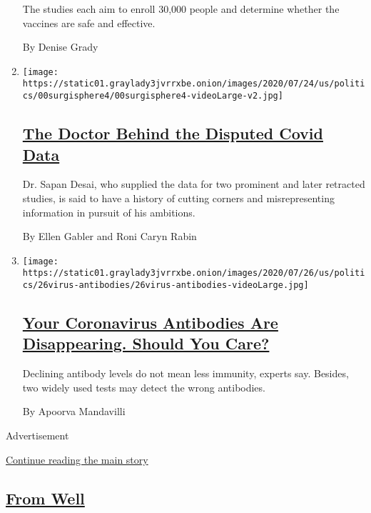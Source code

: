 \begin{enumerate}
  The studies each aim to enroll 30,000 people and determine whether the
  vaccines are safe and effective.

  By Denise Grady
\item
  \texttt{[image: https://static01.graylady3jvrrxbe.onion/images/2020/07/24/us/politics/00surgisphere4/00surgisphere4-videoLarge-v2.jpg]}

  \hypertarget{the-doctor-behind-the-disputed-covid-data}{%
  \subsection{\texorpdfstring{\href{/2020/07/27/science/coronavirus-retracted-studies-data.html}{The
  Doctor Behind the Disputed Covid
  Data}}{The Doctor Behind the Disputed Covid Data}}\label{the-doctor-behind-the-disputed-covid-data}}

  Dr. Sapan Desai, who supplied the data for two prominent and later
  retracted studies, is said to have a history of cutting corners and
  misrepresenting information in pursuit of his ambitions.

  By Ellen Gabler and Roni Caryn Rabin
\item
  \texttt{[image: https://static01.graylady3jvrrxbe.onion/images/2020/07/26/us/politics/26virus-antibodies/26virus-antibodies-videoLarge.jpg]}

  \hypertarget{your-coronavirus-antibodies-are-disappearing-should-you-care}{%
  \subsection{\texorpdfstring{\href{/2020/07/26/health/coronvirus-antibody-tests.html}{Your
  Coronavirus Antibodies Are Disappearing. Should You
  Care?}}{Your Coronavirus Antibodies Are Disappearing. Should You Care?}}\label{your-coronavirus-antibodies-are-disappearing-should-you-care}}

  Declining antibody levels do not mean less immunity, experts say.
  Besides, two widely used tests may detect the wrong antibodies.

  By Apoorva Mandavilli
\end{enumerate}

Advertisement

\protect\hyperlink{after-mid1}{Continue reading the main story}

\hypertarget{from-well}{%
\subsection{\texorpdfstring{\href{/section/well}{From
Well}}{From Well}}\label{from-well}}

